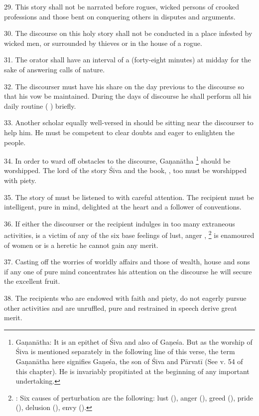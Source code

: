 29. This story shall not be narrated before rogues, wicked persons of crooked
professions and those bent on conquering others in disputes and arguments.

30. The discourse on this holy story shall not be conducted in a place infested
by wicked men, or surrounded by thieves or in the house of a rogue.

31. The orator shall have an interval of a  (forty-eight minutes)
at midday for the sake of answering calls of nature.

32. The discourser must have his share on the day previous to the discourse so
that his vow be maintained. During the days of discourse he shall perform all
his daily routine ( \etc) briefly.

33. Another scholar equally well-versed in  should be sitting near
the discourser to help him. He must be competent to clear doubts and eager to
enlighten the people.

34. In order to ward off obstacles to the discourse, Gaṇanātha
\footnote{Gaṇanātha: It is an epithet of Śiva and also of Gaṇeśa. But as the
worship of Śiva is mentioned separately in the following line of this verse,
the term Gaṇanātha here signifies Gaṇeśa, the son of Śiva and Pārvatī (See v. 54
of this chapter). He is invariably propitiated at the beginning of any important
undertaking.} should be worshipped. The lord of the story Śiva and the book,
, too must be worshipped with piety.

35. The story of  must be listened to with careful attention.
The recipient must be intelligent, pure in mind, delighted at the heart and a
follower of conventions.

36. If either the discourser or the recipient indulges in too many extraneous
activities, is a victim of any of the six base feelings of lust, anger \etc,
\footnote{: Six causes of perturbation are the following: lust
(), anger (), greed (), pride (),
delusion (), envy ().} is enamoured of women or is a
heretic he cannot gain any merit.

37. Casting off the worries of worldly affairs and those of wealth, house and
sons if any one of pure mind concentrates his attention on the discourse he will
secure the excellent fruit.

38. The recipients who are endowed with faith and piety, do not eagerly pursue
other activities and are unruffled, pure and restrained in speech derive great
merit.

